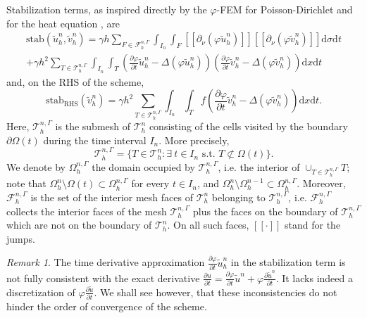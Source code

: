 \documentclass[11pt,a4paper]{article}
\theoremstyle{plain}
\theoremstyle{definition}
\theoremstyle{remark}
\newtheorem{remark}{Remark}%
\numberwithin{equation}{section}
\newcommand{\dx}{\mathrm{d}x}
\newcommand{\dsigma}{\mathrm{d}\sigma}
\newcommand{\dt}{\mathrm{d}t}
\begin{document}
Stabilization terms, as inspired directly by the $\varphi$-FEM for
Poisson-Dirichlet \cite{duprez2020phi} and for the heat equation \cite{heat}, are
\begin{multline*} \text{stab} (\tilde{u}_h^n, \tilde{v}_h^n) = \gamma h \sum_{F\in\mathcal{F}_h^{n, \Gamma}}  \int_{I_n}\int_{F}
 [\![\partial_\nu (\varphi \tilde{u}^n_h) ]\!]
   [\![\partial_\nu (\varphi \tilde{v}_h^n) ]\!] \dsigma \dt \\
   + \gamma h^2 {\sum_{T\in\mathcal{T}_h^{n, \Gamma}}} \int_{I_n} \int_{T} \left(
   \frac{\partial \varphi}{\partial t}  \tilde{u}^n_h - \Delta (\varphi
   \tilde{u}^n_h) \right)  \left( \frac{\partial \varphi}{\partial t}
   \tilde{v}^n_h - \Delta (\varphi \tilde{v}_h^n) \right) \dx \dt
\end{multline*}
and, on the RHS of the scheme,
\[ \text{stab}_{\text{RHS}} (\tilde{v}_h^n) = \gamma h^2  {\sum_{T\in\mathcal{T}_h^{n, \Gamma}}} \int_{I_n}\int_{T} f \left( \frac{\partial \varphi}{\partial t}
   \tilde{v}^n_h - \Delta (\varphi \tilde{v}_h^n) \right) \dx \dt. \]
Here, $\mathcal{T}_h^{n, \Gamma}$ is the submesh of $\mathcal{T}_h^n$ consisting of the cells visited by the boundary $\partial \Omega (t)$ during the time interval $I_n$. More precisely,
\[ \mathcal{T}_h^{n, \Gamma} = \{ T \in \mathcal{T}_h^n : \exists~ t \in I_n \text{ s.t. }T \not\subset \Omega (t) \}. \]
{We denote by $\Omega_h^{n,\Gamma}$ the domain occupied by $\mathcal{T}_h^{n,\Gamma}$, i.e. the interior of $\cup_{T\in\mathcal{T}_h^{n,\Gamma}}T$; note that $\Omega_h^n\setminus\Omega(t)\subset\Omega_h^{n,\Gamma}$ for every $t\in I_n$, and $\Omega_h^n\setminus\Omega_h^{n-1}\subset\Omega_h^{n,\Gamma}$.}
Moreover, $\mathcal{F}_h^{n, \Gamma}$ is the set of the interior mesh faces of $\mathcal{T}_h^n$ belonging to $\mathcal{T}_h^{n, \Gamma}$, i.e. $\mathcal{F}_h^{n, \Gamma}$ collects the interior faces of the mesh $\mathcal{T}_h^{n, \Gamma}$ plus the faces on the boundary of $\mathcal{T}_h^{n, \Gamma}$ which are not on the boundary of $\mathcal{T}_h^{n}$. {On all such faces, $[\![\cdot ]\!]$ stand for the jumps.}

\begin{remark}\label{remNonConsis}
The time derivative approximation $\frac{\partial\varphi}{\partial t}  \tilde{u}^n_h$ in the stabilization term is not fully consistent with the exact derivative $\frac{\partial u}{\partial t}=\frac{\partial \varphi}{\partial t}\tilde{u}^n+\varphi \frac{\partial \tilde{u}^n}{\partial t}$. It lacks indeed a discretization of $\varphi \frac{\partial \tilde{u}}{\partial t}$. We shall see
however, that these inconsistencies do not hinder the order of convergence of the scheme.
\end{remark}
\end{document}
